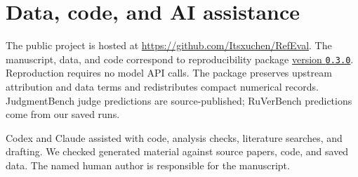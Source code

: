 \documentclass[10pt,letterpaper]{article}
\begin{document}
\section*{Data, code, and AI assistance}
The public project is hosted at \url{https://github.com/Itsxuchen/RefEval}. The manuscript, data, and code correspond to reproducibility package \href{https://github.com/Itsxuchen/RefEval/tree/v0.3.0}{version \texttt{0.3.0}}. Reproduction requires no model API calls. The package preserves upstream attribution and data terms and redistributes compact numerical records. JudgmentBench judge predictions are source-published; RuVerBench predictions come from our saved runs.

Codex and Claude assisted with code, analysis checks, literature searches, and drafting. We checked generated material against source papers, code, and saved data. The named human author is responsible for the manuscript.

\FloatBarrier
\begingroup
\small\raggedright


\endgroup
\clearpage
\appendix

\end{document}
